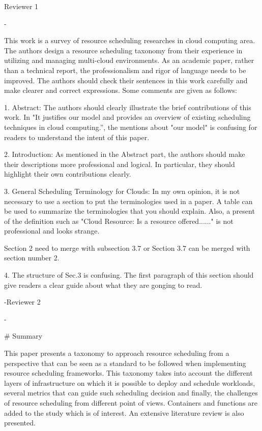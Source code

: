 Reviewer 1

  -

This work is a survey of resource scheduling researches in cloud computing area. The authors design a resource scheduling taxonomy from their experience in utilizing and managing multi-cloud environments. As an academic paper, rather than a technical report, the professionalism and rigor of language needs to be improved. The authors should check their sentences in this work carefully and make clearer and correct expressions. Some comments are given as follows:

1. Abstract: The authors should clearly illustrate the brief contributions of this work. In "It justifies our model and provides an overview of existing scheduling techniques in cloud computing.”, the mentions about "our model" is confusing for readers to understand the intent of this paper.

2. Introduction: As mentioned in the Abstract part, the authors should make their descriptions more professional and logical. In particular, they should highlight their own contributions clearly. 

3. General Scheduling Terminology for Clouds: In my own opinion, it is not necessary to use a section to put the terminologies used in a paper. A table can be used to summarize the terminologies that you should explain. Also, a present of the definition such as "Cloud Resource: Is a resource offered......" is not professional and looks strange.

\color{red}
Section 2  need to merge with subsection 3.7
or 
Section 3.7 can be merged with section number 2.

\color{black}
4. The structure of Sec.3 is confusing. The first paragraph of this section should give readers a clear guide about what they are gonging to read.

\reply 

-Reviewer 2

  -

# Summary

This paper presents a taxonomy to approach resource scheduling from a perspective that can be seen as a standard to be followed when implementing resource scheduling frameworks. This taxonomy takes into account the different layers of infrastructure on which it is possible to deploy and schedule workloads, several metrics that can guide such scheduling decision and finally, the challenges of resource scheduling from different point of views. Containers and functions are added to the study which is of interest. An extensive literature review is also presented.


